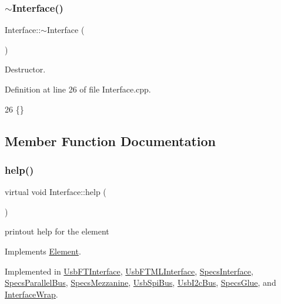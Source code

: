 \subsubsection{\texorpdfstring{$\sim$\+Interface()}{~Interface()}}
{\footnotesize\ttfamily Interface\+::$\sim$\+Interface (\begin{DoxyParamCaption}{ }\end{DoxyParamCaption})\hspace{0.3cm}{\ttfamily [virtual]}}



Destructor. 



Definition at line 26 of file Interface.\+cpp.


\begin{DoxyCode}
26 \{\}
\end{DoxyCode}


\subsection{Member Function Documentation}
\mbox{\label{classInterface_aedd3cf1d964c837e7848ccf81dc9c760}} 
\subsubsection{\texorpdfstring{help()}{help()}}
{\footnotesize\ttfamily virtual void Interface\+::help (\begin{DoxyParamCaption}{ }\end{DoxyParamCaption})\hspace{0.3cm}{\ttfamily [pure virtual]}}

printout help for the element 

Implements \hyperlink{classElement_a32c0de27acb08e17251cef88c3e9303a}{Element}.



Implemented in \hyperlink{classUsbFTInterface_a91a0046390c76ca8abaa330fa244279c}{Usb\+F\+T\+Interface}, \hyperlink{classUsbFTMLInterface_a1cfe65c58531afc07c21d876e21d8e46}{Usb\+F\+T\+M\+L\+Interface}, \hyperlink{classSpecsInterface_a24bf2b5e2da6c675ba5de3b226481a73}{Specs\+Interface}, \hyperlink{classSpecsParallelBus_a67b05d066de051d33a6afff267f9178e}{Specs\+Parallel\+Bus}, \hyperlink{classSpecsMezzanine_a9cbb99c91d987194009be1cb81d2ba7c}{Specs\+Mezzanine}, \hyperlink{classUsbSpiBus_a3543b3bbad0c137fde32fdc554a09a5d}{Usb\+Spi\+Bus}, \hyperlink{classUsbI2cBus_a5c3349f89fff94a8eae3d9752f5fcf6a}{Usb\+I2c\+Bus}, \hyperlink{classSpecsGlue_a04fd0c122ac6980833fd87af92377791}{Specs\+Glue}, and \hyperlink{structInterfaceWrap_abcf87065a7b9099a7d05e7c0ddaf2487}{Interface\+Wrap}.



